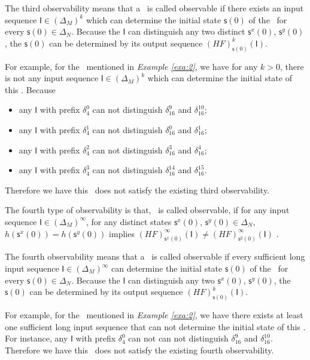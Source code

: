 The third observability means that a \BCN\ is called observable if there exists an input sequence $\mathsf{I}\in(\Delta_M)^k$ which can determine the initial state $\mathsf{s}(0)$ of the \BCN\ for every $\mathsf{s}(0)\in\Delta_N$. Because the $\mathsf{I}$ can distinguish any two distinct $\mathsf{s}^{x}(0)$, $\mathsf{s}^{y}(0)$, the $\mathsf{s}(0)$ can be determined by its output sequence $(HF)^k_{\mathsf{s}(0)}(\mathsf{I})$.

\begin{example}
For example, for the \BCN\ mentioned in {\em Example \ref{exa:2}}, we have for any $k>0$, there is not any input sequence $\mathsf{I}\in(\Delta_M)^k$ which can determine the initial state of this \BCN. Because 
\begin{itemize}
  \item any $\mathsf{I}$ with prefix $\delta_{4}^0$ can not distinguish $\delta_{16}^9$ and $\delta_{16}^{10}$;
  \item any $\mathsf{I}$ with prefix $\delta_{4}^1$ can not distinguish $\delta_{16}^0$ and $\delta_{16}^{1}$;
  \item any $\mathsf{I}$ with prefix $\delta_{4}^2$ can not distinguish $\delta_{16}^3$ and $\delta_{16}^{4}$;
  \item any $\mathsf{I}$ with prefix $\delta_{4}^3$ can not distinguish $\delta_{16}^{14}$ and $\delta_{16}^{15}$.
\end{itemize} 



Therefore we have this \BCN\ does not satisfy the existing third observability.
\label{exa:6}
\end{example}  
\begin{definition}
	The fourth type of observability is that, \BCN\ is called observable, if for any input sequence $\mathsf{I}\in(\Delta_M)^{\infty}$, for any distinct states $\mathsf{s}^{x}(0)$, $\mathsf{s}^{y}(0) \in \Delta_N$, $h(\mathsf{s}^{x}(0))=h(\mathsf{s}^{y}(0))$ implies $(HF)^{\infty}_{\mathsf{s}^{x}(0)}(\mathsf{I})\neq (HF)^{\infty}_{\mathsf{s}^{y}(0)}(\mathsf{I})$ \cite{Fornasini2013Observability}.
\end{definition}

The fourth observability means that a \BCN\ is called observable if every sufficient long input sequence $\mathsf{I}\in(\Delta_M)^{\infty}$ can determine the initial state $\mathsf{s}(0)$ of the \BCN\ for every $\mathsf{s}(0)\in\Delta_N$. Because the $\mathsf{I}$ can distinguish any two $\mathsf{s}^{x}(0)$, $\mathsf{s}^{y}(0)$, the $\mathsf{s}(0)$ can be determined by its output sequence $(HF)^k_{\mathsf{s}(0)}(\mathsf{I})$.
\begin{example}
For example, for the \BCN\ mentioned in {\em Example \ref{exa:2}}, we have there exists at least one sufficient long input sequence that can not determine the initial state of this \BCN. For instance, any $\mathsf{I}$ with prefix $\delta_{4}^0$ can not can not distinguish $\delta_{16}^9$ and $\delta_{16}^{10}$. 
Therefore we have this \BCN\ does not satisfy the existing fourth observability.
\label{exa:7}
\end{example}  

